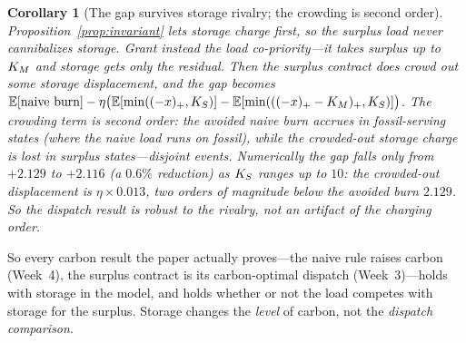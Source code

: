\documentclass[11pt,reqno]{amsart}
\theoremstyle{plain}\newtheorem{proposition}{Proposition}\newtheorem{corollary}[proposition]{Corollary}
\theoremstyle{remark}\newtheorem{remark}[proposition]{Remark}
\begin{document}
\begin{corollary}[The gap survives storage rivalry; the crowding is second order]\label{cor:rivalry}
Proposition~\ref{prop:invariant} lets storage charge first, so the surplus load never
cannibalizes storage. Grant instead the load \emph{co-priority}---it takes surplus up to $K_M$
and storage gets only the residual. Then the surplus contract does crowd out some storage
displacement, and the gap becomes
$\mathbb{E}[\text{naive burn}]-\eta\big(\mathbb{E}[\min((-x)_+,K_S)]-\mathbb{E}[\min(((-x)_+-K_M)_+,K_S)]\big)$.
The crowding term is \emph{second order}: the avoided naive burn accrues in \emph{fossil-serving}
states (where the naive load runs on fossil), while the crowded-out storage charge is lost in
\emph{surplus} states---disjoint events. Numerically the gap falls only from $+2.129$ to
$+2.116$ (a $0.6\%$ reduction) as $K_S$ ranges up to $10$: the crowded-out displacement is
$\eta\times0.013$, two orders of magnitude below the avoided burn $2.129$. So the dispatch
result is robust to the rivalry, not an artifact of the charging order.
\end{corollary}
So every carbon result the paper actually proves---the naive rule raises carbon
(Week~4), the surplus contract is its carbon-optimal dispatch (Week~3)---holds with storage in
the model, and holds whether or not the load competes with storage for the surplus. Storage
changes the \emph{level} of carbon, not the \emph{dispatch comparison}.
\end{document}
